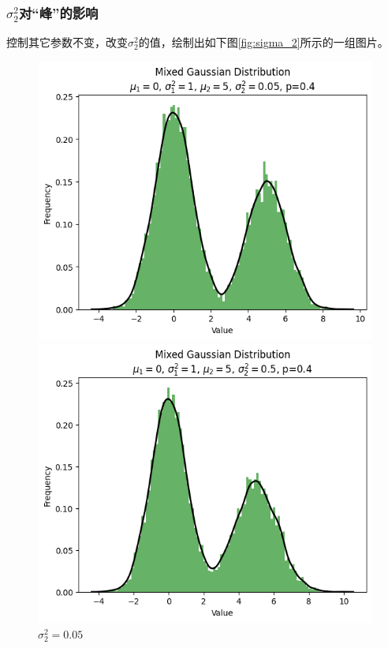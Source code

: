 \documentclass{article}
\begin{document}
\subsubsection{\texorpdfstring{$\sigma_2^2$对“峰”的影响}{sigma2平方对“峰”的影响}}

控制其它参数不变，改变$\sigma_2^2$的值，绘制出如下图\ref{fig:sigma_2}所示的一组图片。

\begin{figure}[H]
    \centering
    \begin{minipage}[b]{0.3\linewidth}
        \centering
        \includegraphics[width=\linewidth]{figure/sigma_^2=0.05.png}
        \caption{$\sigma_2^2=0.05$}
    \end{minipage}
    \hfill
    \begin{minipage}[b]{0.3\linewidth}
        \centering
        \includegraphics[width=\linewidth]{figure/sigma_^2=0.5.png}

\end{minipage}
\end{figure}
\end{document}
